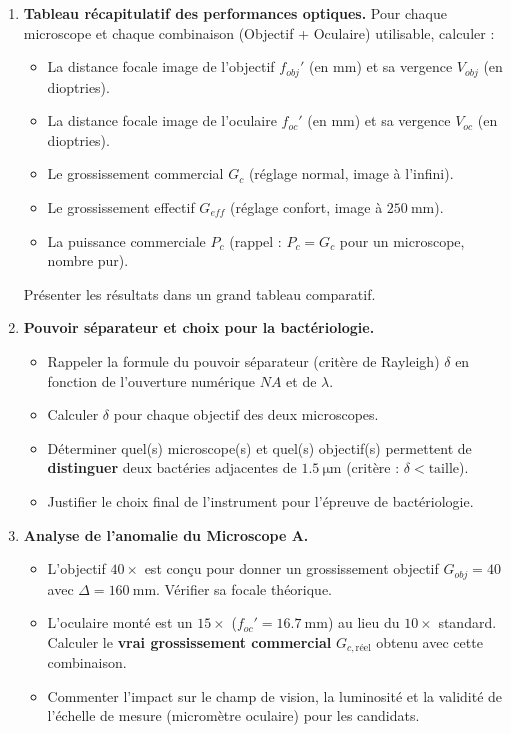 \documentclass[11pt]{article}
\begin{document}
\begin{enumerate}
    \item \textbf{Tableau récapitulatif des performances optiques.} Pour chaque microscope et chaque combinaison (Objectif + Oculaire) utilisable, calculer :
    \begin{itemize}
        \item La distance focale image de l'objectif $f_{obj}'$ (en mm) et sa vergence $V_{obj}$ (en dioptries).
        \item La distance focale image de l'oculaire $f_{oc}'$ (en mm) et sa vergence $V_{oc}$ (en dioptries).
        \item Le grossissement commercial $G_c$ (réglage normal, image à l'infini).
        \item Le grossissement effectif $G_{eff}$ (réglage confort, image à $\SI{250}{\mm}$).
        \item La puissance commerciale $P_c$ (rappel : $P_c = G_c$ pour un microscope, nombre pur).
    \end{itemize}
    Présenter les résultats dans un grand tableau comparatif.

    \item \textbf{Pouvoir séparateur et choix pour la bactériologie.} 
    \begin{itemize}
        \item Rappeler la formule du pouvoir séparateur (critère de Rayleigh) $\delta$ en fonction de l'ouverture numérique $NA$ et de $\lambda$.
        \item Calculer $\delta$ pour chaque objectif des deux microscopes.
        \item Déterminer quel(s) microscope(s) et quel(s) objectif(s) permettent de \textbf{distinguer} deux bactéries adjacentes de $\SI{1,5}{\um}$ (critère : $\delta < \text{taille}$).
        \item Justifier le choix final de l'instrument pour l'épreuve de bactériologie.
    \end{itemize}

    \item \textbf{Analyse de l'anomalie du Microscope A.} 
    \begin{itemize}
        \item L'objectif $40\times$ est conçu pour donner un grossissement objectif $G_{obj} = 40$ avec $\Delta = \SI{160}{\mm}$. Vérifier sa focale théorique.
        \item L'oculaire monté est un $15\times$ ($f_{oc}' = \SI{16,7}{\mm}$) au lieu du $10\times$ standard. Calculer le \textbf{vrai grossissement commercial} $G_{c,\text{réel}}$ obtenu avec cette combinaison.
        \item Commenter l'impact sur le champ de vision, la luminosité et la validité de l'échelle de mesure (micromètre oculaire) pour les candidats.
    \end{itemize}


\end{enumerate}
\end{document}
